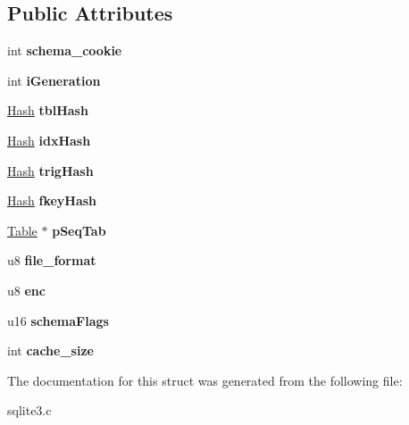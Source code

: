 \subsection*{Public Attributes}
\begin{DoxyCompactItemize}
\item 
int {\bfseries schema\+\_\+cookie}\hypertarget{structSchema_a3eef54a64f4f962d64577646bd34a47c}{}\label{structSchema_a3eef54a64f4f962d64577646bd34a47c}

\item 
int {\bfseries i\+Generation}\hypertarget{structSchema_a879b1597656c7cbcbb98cdb88e876874}{}\label{structSchema_a879b1597656c7cbcbb98cdb88e876874}

\item 
\hyperlink{structHash}{Hash} {\bfseries tbl\+Hash}\hypertarget{structSchema_af841eadc93b289944b95f72b784bfaae}{}\label{structSchema_af841eadc93b289944b95f72b784bfaae}

\item 
\hyperlink{structHash}{Hash} {\bfseries idx\+Hash}\hypertarget{structSchema_ac0dd242f486d17ddadca1e47af76c6c5}{}\label{structSchema_ac0dd242f486d17ddadca1e47af76c6c5}

\item 
\hyperlink{structHash}{Hash} {\bfseries trig\+Hash}\hypertarget{structSchema_ab521f4545d200329d8e1a46bbb67e7c5}{}\label{structSchema_ab521f4545d200329d8e1a46bbb67e7c5}

\item 
\hyperlink{structHash}{Hash} {\bfseries fkey\+Hash}\hypertarget{structSchema_ad51ed96351701cfe8d9e871722827c11}{}\label{structSchema_ad51ed96351701cfe8d9e871722827c11}

\item 
\hyperlink{structTable}{Table} $\ast$ {\bfseries p\+Seq\+Tab}\hypertarget{structSchema_ad580e4e662724bee95571d297f94da37}{}\label{structSchema_ad580e4e662724bee95571d297f94da37}

\item 
u8 {\bfseries file\+\_\+format}\hypertarget{structSchema_ab9f0371436e41b3080772995407a4cca}{}\label{structSchema_ab9f0371436e41b3080772995407a4cca}

\item 
u8 {\bfseries enc}\hypertarget{structSchema_a1338d09fe9cbb5a8162929202cb73cae}{}\label{structSchema_a1338d09fe9cbb5a8162929202cb73cae}

\item 
u16 {\bfseries schema\+Flags}\hypertarget{structSchema_a19310cba7982138909683b1801258c18}{}\label{structSchema_a19310cba7982138909683b1801258c18}

\item 
int {\bfseries cache\+\_\+size}\hypertarget{structSchema_a0a66691be95a30c099ca4840da7110dd}{}\label{structSchema_a0a66691be95a30c099ca4840da7110dd}

\end{DoxyCompactItemize}


The documentation for this struct was generated from the following file\+:\begin{DoxyCompactItemize}
\item 
sqlite3.\+c\end{DoxyCompactItemize}
